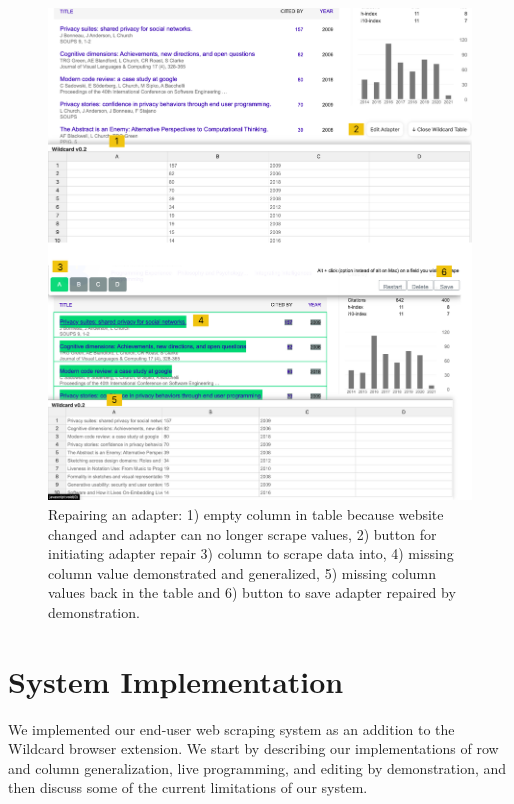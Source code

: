 \documentclass[sigconf,10pt]{acmart}
\begin{document}
\begin{figure}
  \includegraphics[width=\textwidth]{media/repairing.png}
  \caption{\label{fig:repairing} Repairing an adapter: 1) empty column in table because website changed and adapter can no longer scrape values, 2) button for initiating adapter repair 3) column to scrape data into, 4) missing column value demonstrated and generalized, 5) missing column values back in the table and 6) button to save adapter repaired by demonstration.}
\end{figure}

\hypertarget{sec:implementation}{%
\section{System Implementation}\label{sec:implementation}}

We implemented our end-user web scraping system as an addition to the
Wildcard browser extension. We start by describing our implementations
of row and column generalization, live programming, and editing by
demonstration, and then discuss some of the current limitations of our
system.
\end{document}
